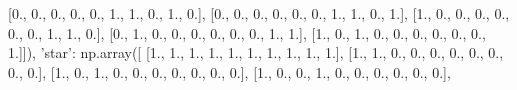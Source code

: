 \documentclass[11pt]{article}
\newenvironment{Shaded}{}{}
\newcommand{\DecValTok}[1]{\textcolor[rgb]{0.25,0.63,0.44}{{#1}}}
\newcommand{\StringTok}[1]{\textcolor[rgb]{0.25,0.44,0.63}{{#1}}}
\newcommand{\NormalTok}[1]{{#1}}
\begin{document}
\begin{Shaded}
\begin{Highlighting}[]
\NormalTok{        [}\DecValTok{0}\NormalTok{., }\DecValTok{0}\NormalTok{., }\DecValTok{0}\NormalTok{., }\DecValTok{0}\NormalTok{., }\DecValTok{0}\NormalTok{., }\DecValTok{1}\NormalTok{., }\DecValTok{1}\NormalTok{., }\DecValTok{0}\NormalTok{., }\DecValTok{1}\NormalTok{., }\DecValTok{0}\NormalTok{.],}
\NormalTok{        [}\DecValTok{0}\NormalTok{., }\DecValTok{0}\NormalTok{., }\DecValTok{0}\NormalTok{., }\DecValTok{0}\NormalTok{., }\DecValTok{0}\NormalTok{., }\DecValTok{0}\NormalTok{., }\DecValTok{1}\NormalTok{., }\DecValTok{1}\NormalTok{., }\DecValTok{0}\NormalTok{., }\DecValTok{1}\NormalTok{.],}
\NormalTok{        [}\DecValTok{1}\NormalTok{., }\DecValTok{0}\NormalTok{., }\DecValTok{0}\NormalTok{., }\DecValTok{0}\NormalTok{., }\DecValTok{0}\NormalTok{., }\DecValTok{0}\NormalTok{., }\DecValTok{0}\NormalTok{., }\DecValTok{1}\NormalTok{., }\DecValTok{1}\NormalTok{., }\DecValTok{0}\NormalTok{.],}
\NormalTok{        [}\DecValTok{0}\NormalTok{., }\DecValTok{1}\NormalTok{., }\DecValTok{0}\NormalTok{., }\DecValTok{0}\NormalTok{., }\DecValTok{0}\NormalTok{., }\DecValTok{0}\NormalTok{., }\DecValTok{0}\NormalTok{., }\DecValTok{0}\NormalTok{., }\DecValTok{1}\NormalTok{., }\DecValTok{1}\NormalTok{.],}
\NormalTok{        [}\DecValTok{1}\NormalTok{., }\DecValTok{0}\NormalTok{., }\DecValTok{1}\NormalTok{., }\DecValTok{0}\NormalTok{., }\DecValTok{0}\NormalTok{., }\DecValTok{0}\NormalTok{., }\DecValTok{0}\NormalTok{., }\DecValTok{0}\NormalTok{., }\DecValTok{0}\NormalTok{., }\DecValTok{1}\NormalTok{.]]),}
    \StringTok{'star'}\NormalTok{: np.array([}
\NormalTok{        [}\DecValTok{1}\NormalTok{., }\DecValTok{1}\NormalTok{., }\DecValTok{1}\NormalTok{., }\DecValTok{1}\NormalTok{., }\DecValTok{1}\NormalTok{., }\DecValTok{1}\NormalTok{., }\DecValTok{1}\NormalTok{., }\DecValTok{1}\NormalTok{., }\DecValTok{1}\NormalTok{., }\DecValTok{1}\NormalTok{.],}
\NormalTok{        [}\DecValTok{1}\NormalTok{., }\DecValTok{1}\NormalTok{., }\DecValTok{0}\NormalTok{., }\DecValTok{0}\NormalTok{., }\DecValTok{0}\NormalTok{., }\DecValTok{0}\NormalTok{., }\DecValTok{0}\NormalTok{., }\DecValTok{0}\NormalTok{., }\DecValTok{0}\NormalTok{., }\DecValTok{0}\NormalTok{.],}
\NormalTok{        [}\DecValTok{1}\NormalTok{., }\DecValTok{0}\NormalTok{., }\DecValTok{1}\NormalTok{., }\DecValTok{0}\NormalTok{., }\DecValTok{0}\NormalTok{., }\DecValTok{0}\NormalTok{., }\DecValTok{0}\NormalTok{., }\DecValTok{0}\NormalTok{., }\DecValTok{0}\NormalTok{., }\DecValTok{0}\NormalTok{.],}
\NormalTok{        [}\DecValTok{1}\NormalTok{., }\DecValTok{0}\NormalTok{., }\DecValTok{0}\NormalTok{., }\DecValTok{1}\NormalTok{., }\DecValTok{0}\NormalTok{., }\DecValTok{0}\NormalTok{., }\DecValTok{0}\NormalTok{., }\DecValTok{0}\NormalTok{., }\DecValTok{0}\NormalTok{., }\DecValTok{0}\NormalTok{.],}

\end{Highlighting}
\end{Shaded}
\end{document}
